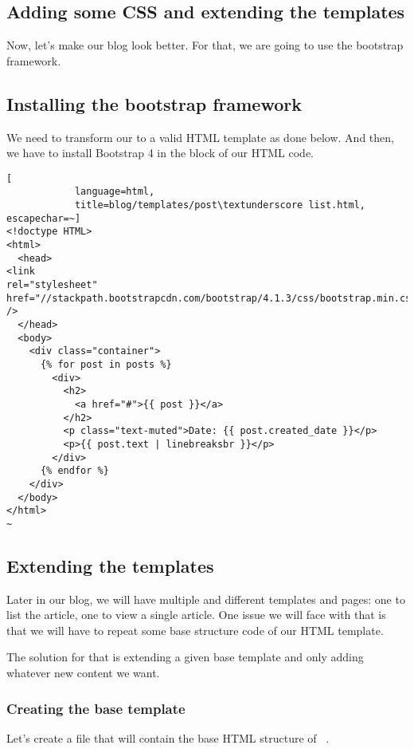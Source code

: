 \subsection{Adding some CSS and extending the templates}
    Now, let's make our blog look better. For that, we are going to use the bootstrap framework.
    
    \subsection{Installing the bootstrap framework}
        We need to transform our  to a valid 
        HTML template as done below. And then, we have to install Bootstrap 4
        in the  block of our HTML code.
        
        \begin{lstlisting}[
            language=html, 
            title=blog/templates/post\textunderscore list.html, escapechar=~]
<!doctype HTML>
<html>
  <head>
<link
rel="stylesheet"
href="//stackpath.bootstrapcdn.com/bootstrap/4.1.3/css/bootstrap.min.css"
/>
  </head>
  <body>
    <div class="container">
      {% for post in posts %}
        <div>
          <h2>
            <a href="#">{{ post }}</a>
          </h2>
          <p class="text-muted">Date: {{ post.created_date }}</p>
          <p>{{ post.text | linebreaksbr }}</p>
        </div>
      {% endfor %}
    </div>
  </body>
</html>
~
        \end{lstlisting}
    
    \subsection{Extending the templates}
        Later in our blog, we will have multiple 
        and different templates and pages: one to list the article, one to view a single article.
        One issue we will face with that is that we will have to repeat some base structure 
        code of our HTML template.
        
        The solution for that is extending a given base template and only adding whatever 
        new content we want.
        
        \subsubsection{Creating the base template}
            Let's create a  file that will contain the base HTML structure of~
            .
            
